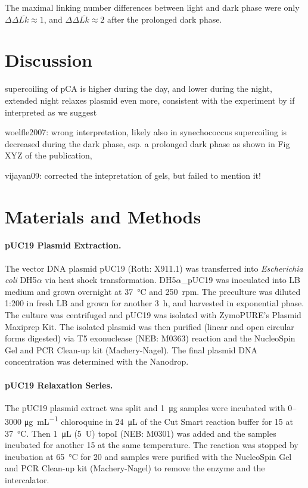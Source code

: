 \documentclass[10pt,letterpaper]{article}
\newcommand{\ugml}{\micro\gram\per\milli\liter}
\begin{document}
The maximal linking number differences between light and dark phase
were only $\Delta \Delta \overline{Lk} \approx 1$, and $\Delta \Delta
\overline{Lk} \approx 2$ after the prolonged dark phase.


\section{Discussion}

supercoiling of pCA is higher during the day, and lower during the
night, extended night relaxes plasmid even more, consistent
with the experiment by \cite{Woelfle2007} if interpreted
as we suggest

woelfle2007: wrong interpretation, likely also in synechococcus
supercoiling is decreased during the dark phase, esp. a prolonged
dark phase as shown in Fig XYZ of the publication,


vijayan09: corrected the intepretation of gels, but failed to mention
it!

\clearpage

\section{Materials and Methods}

\paragraph{pUC19 Plasmid Extraction.}
The vector DNA plasmid pUC19 (Roth: X911.1) was transferred into
\textit{Escherichia coli} DH5$\alpha$ via heat shock
transformation. DH5$\alpha$\_pUC19 was inoculated into LB medium and
grown overnight at \SI{37}{\celsius} and \SI{250}{rpm}. The preculture
was diluted 1:200 in fresh LB and grown for another \SI{3}{\hour}, and
harvested in exponential phase. The culture was centrifuged and pUC19
was isolated with ZymoPURE's Plasmid Maxiprep Kit. The isolated
plasmid was then purified (linear and open circular forms digested)
via T5 exonuclease (NEB: M0363) reaction and the NucleoSpin Gel and
PCR Clean-up kit (Machery-Nagel). The final plasmid DNA
concentration was determined with the Nanodrop.
%
\paragraph{pUC19 Relaxation Series.}
The pUC19 plasmid extract was split and \SI{1}{\ug} samples were
incubated with 0--3000 \si{\ugml} chloroquine in \SI{24}{\uL} of the
Cut Smart reaction buffer for \SI{15}{\min} at \SI{37}{\celsius}. Then
\SI{1}{\uL} (\SI{5}{U}) topoI (NEB: M0301) was added and the
samples incubated for another \SI{15}{\min} at the same
temperature. The reaction was stopped by incubation at
\SI{65}{\celsius} for \SI{20}{\min} and samples were purified with the
NucleoSpin Gel and PCR Clean-up kit (Machery-Nagel) to remove the
enzyme and the intercalator.
\end{document}
